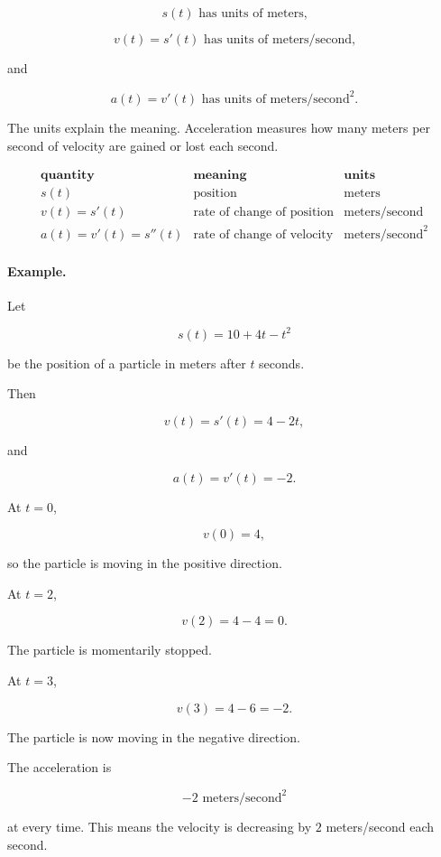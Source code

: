 \[
s(t)\text{ has units of meters,}
\]

\[
v(t)=s'(t)\text{ has units of meters/second,}
\]

and

\[
a(t)=v'(t)\text{ has units of meters/second}^2.
\]

The units explain the meaning.  Acceleration measures how many meters per second of velocity are gained or lost each second.

\[
\begin{array}{c|c|c}
\textbf{quantity} & \textbf{meaning} & \textbf{units} \\ \hline
s(t) & \text{position} & \text{meters} \\[2pt]
v(t)=s'(t) & \text{rate of change of position} & \text{meters/second} \\[2pt]
a(t)=v'(t)=s''(t) & \text{rate of change of velocity} & \text{meters/second}^2
\end{array}
\]

\paragraph{Example.}
Let

\[
s(t)=10+4t-t^2
\]

be the position of a particle in meters after \(t\) seconds.

Then

\[
v(t)=s'(t)=4-2t,
\]

and

\[
a(t)=v'(t)=-2.
\]

At \(t=0\),

\[
v(0)=4,
\]

so the particle is moving in the positive direction.

At \(t=2\),

\[
v(2)=4-4=0.
\]

The particle is momentarily stopped.

At \(t=3\),

\[
v(3)=4-6=-2.
\]

The particle is now moving in the negative direction.

The acceleration is

\[
-2\text{ meters/second}^2
\]

at every time.  This means the velocity is decreasing by \(2\) meters/second each second.

